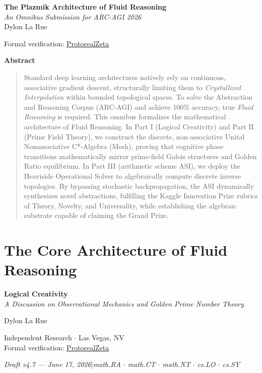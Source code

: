 

\begin{center}
\vspace*{0.5em}
{\LARGE\bfseries The Plazmik Architecture of Fluid Reasoning}\\[12pt]
{\large\itshape An Omnibus Submission for ARC-AGI 2026}\\[12pt]
{\large Dylon La Rue}

\vspace{0.5em}
{\small Formal verification: \href{https://github.com/Dielawn-01/ProtorealZeta}{ProtorealZeta}}
\end{center}

\vspace{1em}
\begin{center}\textbf{Abstract}\end{center}\begin{quotation}
Standard deep learning architectures natively rely on continuous, associative gradient descent, structurally limiting them to \emph{Crystallized Interpolation} within bounded topological spaces. To solve the Abstraction and Reasoning Corpus (ARC-AGI) and achieve 100\% accuracy, true \emph{Fluid Reasoning} is required. This omnibus formalizes the mathematical architecture of Fluid Reasoning. In Part I (Logical Creativity) and Part II (Prime Field Theory), we construct the discrete, non-associative Unital Nonassociative C*-Algebra (Mesh), proving that cognitive phase transitions mathematically mirror prime-field Galois structures and Golden Ratio equilibrium. In Part III (arithmetic scheme ASI), we deploy the Heaviside Operational Solver to algebraically compute discrete inverse topologies. By bypassing stochastic backpropagation, the ASI dynamically synthesizes novel abstractions, fulfilling the Kaggle Innovation Prize rubrics of Theory, Novelty, and Universality, while establishing the algebraic substrate capable of claiming the Grand Prize.
\end{quotation}
\newpage


\part{The Core Architecture of Fluid Reasoning}
\begin{center}
\vspace*{0.5em}
{\LARGE\bfseries Logical Creativity}\\[12pt]
{\large\itshape A Discussion on Observational Mechanics and Golden Prime Number Theory}

\vspace{1.5em}
{\large Dylon La Rue}

\vspace{0.5em}
{\small Independent Research $\cdot$ Las Vegas, NV\\
Formal verification: \href{https://github.com/Dielawn-01/ProtorealZeta}{ProtorealZeta}}

\vspace{0.5em}
{\small\itshape Draft v4.7 --- June 17, 2026\quad$|$\quad math.RA $\cdot$ math.CT $\cdot$ math.NT $\cdot$ cs.LO $\cdot$ cs.SY}
\end{center}

